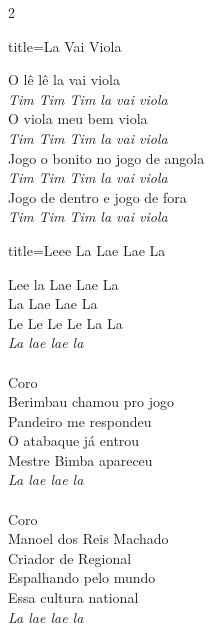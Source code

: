 \documentclass[fontsize=14pt, paper=a4, twoside, DIV=20]{scrreprt} %
\begin{document}
\begin{multicols*}{2}
\begin{song}{title={La Vai Viola}}
    \begin{verse*}
        O lê lê la vai viola\\
        \textit{Tim Tim Tim la vai viola}\\
        O viola meu bem viola\\
        \textit{Tim Tim Tim la vai viola}\\
        Jogo o bonito no jogo de angola\\
        \textit{Tim Tim Tim la vai viola}\\
        Jogo de dentro e jogo de fora\\
        \textit{Tim Tim Tim la vai viola}\\
        \end{verse*}
\end{song}

\begin{song}{title={Leee La Lae Lae La}}
        \begin{verse*}
            Lee la Lae Lae La\\
            La Lae Lae La\\
            Le Le Le Le La La\\
            \textit{La lae lae la}\\
\\
            Coro\\
            Berimbau chamou pro jogo\\
            Pandeiro me respondeu\\
            O atabaque já entrou\\
            Mestre Bimba apareceu\\
            \textit{La lae lae la}\\
\\
            Coro\\
            Manoel dos Reis Machado\\
            Criador de Regional\\
            Espalhando pelo mundo\\
            Essa cultura national\\
            \textit{La lae lae la}\\


\end{verse*}
\end{song}
\end{multicols*}
\end{document}
